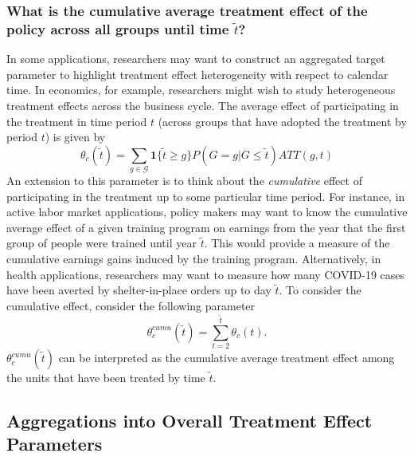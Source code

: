 \documentclass[11pt]{article}%
\theoremstyle{plain}
\numberwithin{sassumption}{section}
\numberwithin{equation}{section}
\begin{document}
\subsubsection{What is the cumulative average treatment effect of the policy
across all groups until time $\tilde{t}$?}

In some applications, researchers may want to construct an aggregated target
parameter to highlight treatment effect heterogeneity with respect to calendar
time. In economics, for example, researchers might wish to study heterogeneous
treatment effects across the business cycle. The
average effect of participating in the treatment in time period $t$ (across
groups that have adopted the treatment by period $t$) is given by
\begin{equation}
\theta_{c}(\tilde{t})=\sum_{g\in\mathcal{G}}\mathbf{1}\{\tilde{t}\geq
g\}P(G=g|G\leq\tilde{t})ATT(g,t) \label{eqn:agg-cal}%
\end{equation}
An extension to this parameter is to think about the \textit{cumulative}
effect of participating in the treatment up to some particular time period.
For instance, in active labor market applications, policy makers may want to
know the cumulative average effect of a given training program on earnings
from the year that the first group of people were trained until year
$\tilde{t}$. This would provide a measure of the cumulative earnings gains
induced by the training program. Alternatively, in health applications,
researchers may want to measure how many COVID-19 cases have been averted by
shelter-in-place orders up to day $\tilde{t}$. To consider the cumulative
effect, consider the following parameter
\begin{equation}
\theta_{c}^{cumu}\left(  \tilde{t}\right)  =\sum_{t=2}^{\tilde{t}}\theta
_{c}(t). \label{eqn:agg-cumu}%
\end{equation}
$\theta_{c}^{cumu}\left(  \tilde{t}\right)  $ can be interpreted as the
cumulative average treatment effect among the units that have been treated by
time $\tilde{t}$.

\subsection{Aggregations into Overall Treatment Effect
Parameters\label{sec:overall}}
\end{document}

